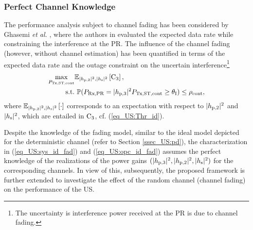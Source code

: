 \subsubsection{Perfect Channel Knowledge}
The performance analysis subject to channel fading has been considered by Ghasemi \textit{et al.} \cite{Ghasemi06, Ghasemi07}, where the authors in \cite{Ghasemi06, Ghasemi07} evaluated the expected data rate while constraining the interference at the PR. The influence of the channel fading (however, without channel estimation) has been quantified in terms of the expected data rate and the outage constraint on the uncertain interference\footnote{The uncertainty is interference power received at the PR is due to channel fading.} %
\begin{align}
	\max_{P_{\text{Tx,ST,cont}}} & {\mathbb E}_{|h_{\text{p,2}}|^2, |h_{\text{s}}|^2 }\left[  \text{C}_{\text{3}}  \right] \label{eq_US:sys_id_fad}, \\
	\text{s.t.} & \text{ } \mathbb P(P_{\text{Rx,PR}}= |h_{\text{p,3}}|^2 P_{\text{Tx,ST,cont}} \ge \theta_{\text{I}}) \le \rho_{\text{cont}}, \label{eq_US:opc_id_fad} 
\end{align}
where ${\mathbb E}_{|h_{\text{p,2}}|^2, |h_{\text{s}}|^2}\left[ \cdot \right]$ corresponds to an expectation with respect to $|h_{\text{p,2}}|^2$ and $|h_{\text{s}}|^2$, which are entailed in $\text{C}_{\text{3}}$, cf. (\ref{eq_US:Thr_id}).

Despite the knowledge of the fading model, similar to the ideal model depicted for the deterministic channel (refer to Section \ref{ssec_US:pd}), the characterization in (\ref{eq_US:sys_id_fad}) and (\ref{eq_US:opc_id_fad}) assumes the perfect knowledge of the realizations of the power gains $(|h_{\text{p,3}}|^2, |h_{\text{p,2}}|^2, |h_{\text{s}}|^2)$ for the corresponding channels. In view of this, subsequently, the proposed framework is further extended to investigate the effect of the random channel (channel fading) on the performance of the US.

